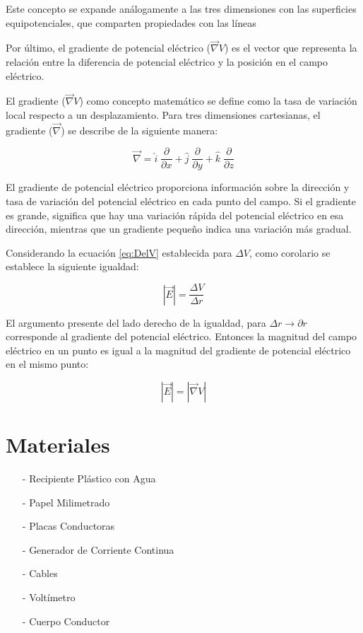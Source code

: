 \documentclass{article}
\begin{document}
Este concepto se expande análogamente a las tres dimensiones con las superficies equipotenciales, que comparten propiedades con las líneas

Por último, el gradiente de potencial eléctrico ($\vec{\nabla} V$) es el vector que representa la relación entre la diferencia de potencial eléctrico y la posición en el campo eléctrico.

El gradiente ($\vec{\nabla} V$) como concepto matemático se define como la tasa de variación local respecto a un desplazamiento. Para tres dimensiones cartesianas, el gradiente ($\vec{\nabla}$) se describe de la siguiente manera:

\begin{equation*}
	\vec{\nabla} = \hat{i} \; \frac{\partial}{\partial x} + \hat{j} \; \frac{\partial}{\partial y} + \hat{k} \; \frac{\partial}{\partial z}
\end{equation*}

El gradiente de potencial eléctrico  proporciona información sobre la dirección y tasa de variación del potencial eléctrico en cada punto del campo. Si el gradiente es grande, significa que hay una variación rápida del potencial eléctrico en esa dirección, mientras que un gradiente pequeño indica una variación más gradual.

Considerando la ecuación \ref{eq:DelV} establecida para $\Delta V$, como corolario se establece la siguiente igualdad:

\begin{equation*}
    |\Vec{E}| = \frac{\Delta V}{\Delta r}
\end{equation*}

El argumento presente del lado derecho de la igualdad, para $\Delta r \rightarrow \partial r$ corresponde al gradiente del potencial eléctrico. Entonces la magnitud del campo eléctrico en un punto es igual a la magnitud del gradiente de potencial eléctrico en el mismo punto:

\begin{equation}
    |\Vec{E}| = |\vec{\nabla} V|
    \label{eq:MagE}
\end{equation}

\section{Materiales}

\begin{itemize}
  \item [-] Recipiente Plástico con Agua
  \item [-] Papel Milimetrado
  \item [-] Placas Conductoras
  \item [-] Generador de Corriente Continua
  \item [-] Cables
  \item [-] Voltímetro
  \item [-] Cuerpo Conductor
\end{itemize}
\end{document}
